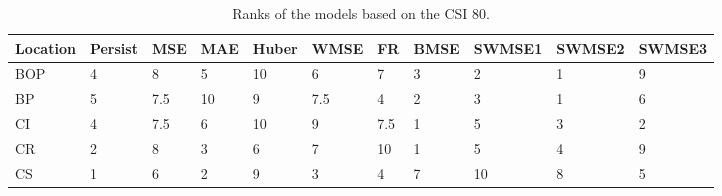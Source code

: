 \documentclass[11pt, a4paper]{article}
\begin{document}
\begin{table}[H]
\centering
\fontsize{5}{6}\selectfont
\caption{Ranks of the models based on the CSI 80.}\label{tb:rankcsi80}
\begin{tabular}{lllllllllll}
\multicolumn{1}{c}{\textbf{Location}} & \multicolumn{1}{c}{\textbf{Persist}} & \multicolumn{1}{c}{\textbf{MSE}} & \multicolumn{1}{c}{\textbf{MAE}} & \multicolumn{1}{c}{\textbf{Huber}} & \multicolumn{1}{c}{\textbf{WMSE}} & \multicolumn{1}{c}{\textbf{FR}} & \multicolumn{1}{c}{\textbf{BMSE}} & \multicolumn{1}{c}{\textbf{SWMSE1}} & \multicolumn{1}{c}{\textbf{SWMSE2}} & \multicolumn{1}{c}{\textbf{SWMSE3}} \\ \hline
BOP                         & 4                                        & 8                                & 5                                & 10                                 & 6                                 & 7                               & 3                                 & 2                                   & 1                                   & 9                                   \\
BP                        & 5                                        & 7.5                              & 10                               & 9                                  & 7.5                               & 4                               & 2                                 & 3                                   & 1                                   & 6                                   \\
CI                        & 4                                        & 7.5                              & 6                                & 10                                 & 9                                 & 7.5                             & 1                                 & 5                                   & 3                                   & 2                                   \\
CR                           & 2                                        & 8                                & 3                                & 6                                  & 7                                 & 10                              & 1                                 & 5                                   & 4                                   & 9                                   \\
CS                           & 1                                        & 6                                & 2                                & 9                                  & 3                                 & 4                               & 7                                 & 10                                  & 8                                   & 5                                   \\

\end{tabular}
\end{table}
\end{document}
